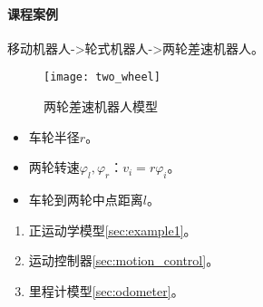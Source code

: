 \documentclass[
12pt, %
a4paper, 
oneside, %
headinclude,footinclude, %
]{scrartcl}
\begin{document}
\paragraph{课程案例}\label{sec:two_wheel}
移动机器人->轮式机器人->两轮差速机器人。

\noindent
\begin{minipage}{0.3\textwidth}
\begin{figure}[H]
\centering
\texttt{[image: two\_wheel]} 
\caption{两轮差速机器人模型}
\end{figure}
\end{minipage}
\begin{minipage}{0.4\textwidth}
\begin{itemize}
\item 车轮半径$ r $。
\item 两轮转速$ \varphi_l,\varphi_r $：$ v_i = r\varphi_i $。
\item 车轮到两轮中点距离$ l $。
\end{itemize}
\end{minipage}
\begin{minipage}{0.3\textwidth}
\begin{enumerate}
\item 正运动学模型\ref{sec:example1}。
\item 运动控制器\ref{sec:motion_control}。
\item 里程计模型\ref{sec:odometer}。
\end{enumerate}
\end{minipage}
\end{document}
